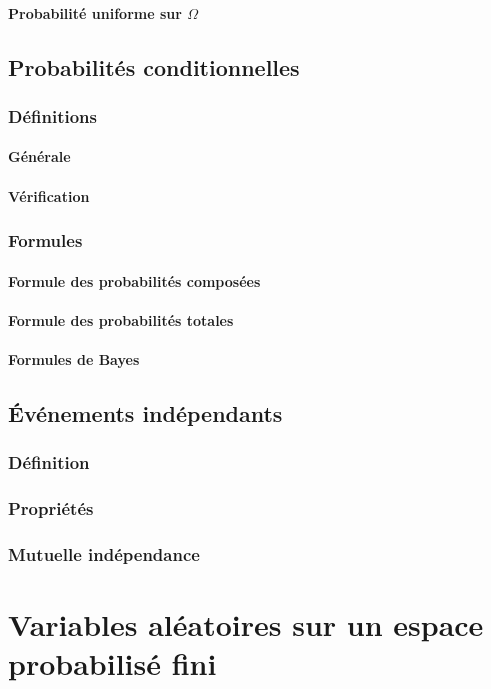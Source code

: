 \documentclass[12pt,a4paper,french]{book}
\begin{document}
			\subsubsection{Probabilité uniforme sur $\Omega$}
	\section{Probabilités conditionnelles}
		\subsection{Définitions}
			\subsubsection{Générale}
			\subsubsection{Vérification}
		\subsection{Formules}
			\subsubsection{Formule des probabilités composées}
			\subsubsection{Formule des probabilités totales}
			\subsubsection{Formules de Bayes}
	\section{Événements indépendants}
		\subsection{Définition}
		\subsection{Propriétés}
		\subsection{Mutuelle indépendance}

\chapter{Variables aléatoires sur un espace probabilisé fini}
\end{document}
